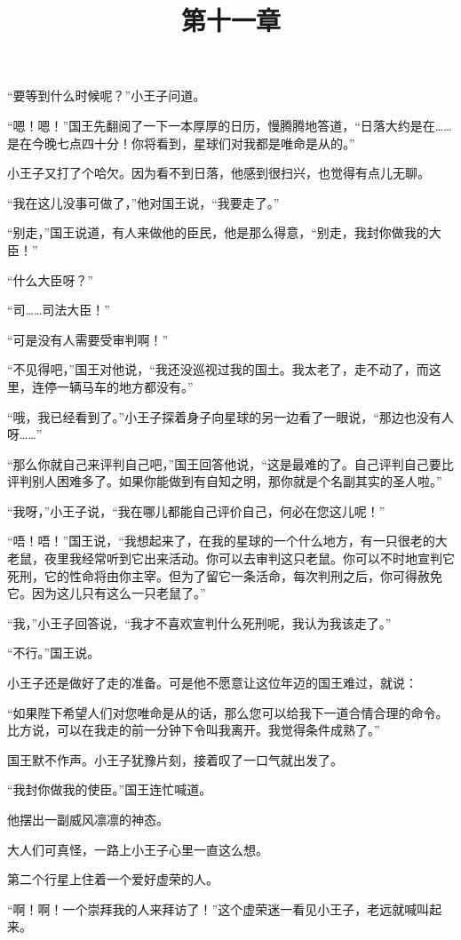 “要等到什么时候呢？”小王子问道。

“嗯！嗯！”国王先翻阅了一下一本厚厚的日历，慢腾腾地答道，“日落大约是在\ldots{}\ldots{}是在今晚七点四十分！你将看到，星球们对我都是唯命是从的。”

小王子又打了个哈欠。因为看不到日落，他感到很扫兴，也觉得有点儿无聊。

“我在这儿没事可做了，”他对国王说，“我要走了。”

“别走，”国王说道，有人来做他的臣民，他是那么得意，“别走，我封你做我的大臣！”

“什么大臣呀？”

“司\ldots{}\ldots{}司法大臣！”

“可是没有人需要受审判啊！”

“不见得吧，”国王对他说，“我还没巡视过我的国土。我太老了，走不动了，而这里，连停一辆马车的地方都没有。”

“哦，我已经看到了。”小王子探着身子向星球的另一边看了一眼说，“那边也没有人呀\ldots{}\ldots{}”

“那么你就自己来评判自己吧，”国王回答他说，“这是最难的了。自己评判自己要比评判别人困难多了。如果你能做到有自知之明，那你就是个名副其实的圣人啦。”

“我呀，”小王子说，“我在哪儿都能自己评价自己，何必在您这儿呢！”

“唔！唔！”国王说，“我想起来了，在我的星球的一个什么地方，有一只很老的大老鼠，夜里我经常听到它出来活动。你可以去审判这只老鼠。你可以不时地宣判它死刑，它的性命将由你主宰。但为了留它一条活命，每次判刑之后，你可得赦免它。因为这儿只有这么一只老鼠了。”

“我，”小王子回答说，“我才不喜欢宣判什么死刑呢，我认为我该走了。”

“不行。”国王说。

小王子还是做好了走的准备。可是他不愿意让这位年迈的国王难过，就说：

“如果陛下希望人们对您唯命是从的话，那么您可以给我下一道合情合理的命令。比方说，可以在我走的前一分钟下令叫我离开。我觉得条件成熟了。”

国王默不作声。小王子犹豫片刻，接着叹了一口气就出发了。

“我封你做我的使臣。”国王连忙喊道。

他摆出一副威风凛凛的神态。

大人们可真怪，一路上小王子心里一直这么想。

\title{第十一章}

第二个行星上住着一个爱好虚荣的人。

“啊！啊！一个崇拜我的人来拜访了！”这个虚荣迷一看见小王子，老远就喊叫起来。

